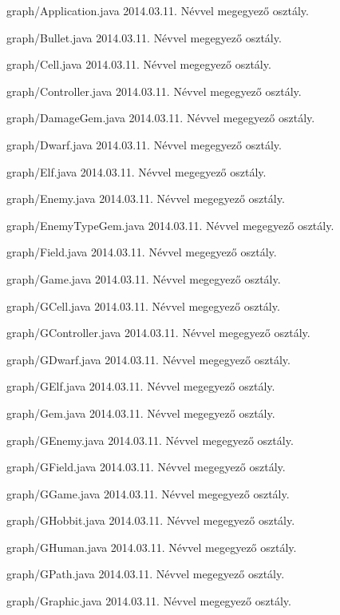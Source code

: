 \begin{fajllista}

\fajl
{graph/Application.java}
{}
{2014.03.11.}
{Névvel megegyező osztály.}

\fajl
{graph/Bullet.java}
{}
{2014.03.11.}
{Névvel megegyező osztály.}

\fajl
{graph/Cell.java}
{}
{2014.03.11.}
{Névvel megegyező osztály.}

\fajl
{graph/Controller.java}
{}
{2014.03.11.}
{Névvel megegyező osztály.}

\fajl
{graph/DamageGem.java}
{}
{2014.03.11.}
{Névvel megegyező osztály.}

\fajl
{graph/Dwarf.java}
{}
{2014.03.11.}
{Névvel megegyező osztály.}

\fajl
{graph/Elf.java}
{}
{2014.03.11.}
{Névvel megegyező osztály.}

\fajl
{graph/Enemy.java}
{}
{2014.03.11.}
{Névvel megegyező osztály.}

\fajl
{graph/EnemyTypeGem.java}
{}
{2014.03.11.}
{Névvel megegyező osztály.}

\fajl
{graph/Field.java}
{}
{2014.03.11.}
{Névvel megegyező osztály.}

\fajl
{graph/Game.java}
{}
{2014.03.11.}
{Névvel megegyező osztály.}

\fajl
{graph/GCell.java}
{}
{2014.03.11.}
{Névvel megegyező osztály.}

\fajl
{graph/GController.java}
{}
{2014.03.11.}
{Névvel megegyező osztály.}

\fajl
{graph/GDwarf.java}
{}
{2014.03.11.}
{Névvel megegyező osztály.}

\fajl
{graph/GElf.java}
{}
{2014.03.11.}
{Névvel megegyező osztály.}

\fajl
{graph/Gem.java}
{}
{2014.03.11.}
{Névvel megegyező osztály.}

\fajl
{graph/GEnemy.java}
{}
{2014.03.11.}
{Névvel megegyező osztály.}

\fajl
{graph/GField.java}
{}
{2014.03.11.}
{Névvel megegyező osztály.}

\fajl
{graph/GGame.java}
{}
{2014.03.11.}
{Névvel megegyező osztály.}

\fajl
{graph/GHobbit.java}
{}
{2014.03.11.}
{Névvel megegyező osztály.}

\fajl
{graph/GHuman.java}
{}
{2014.03.11.}
{Névvel megegyező osztály.}

\fajl
{graph/GPath.java}
{}
{2014.03.11.}
{Névvel megegyező osztály.}

\fajl
{graph/Graphic.java}
{}
{2014.03.11.}
{Névvel megegyező osztály.}


\end{fajllista}
